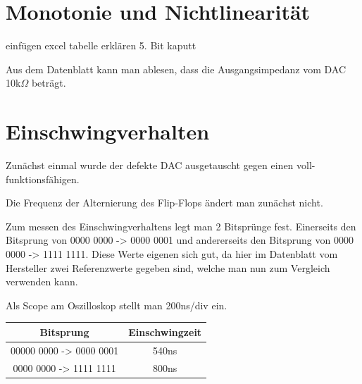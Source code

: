 \section{Monotonie und Nichtlinearität}
einfügen excel tabelle
erklären 5. Bit kaputt


Aus dem Datenblatt kann man ablesen, dass die Ausgangsimpedanz vom
DAC 10k$\Omega$ beträgt.



\section{Einschwingverhalten}

Zunächst einmal wurde der defekte DAC ausgetauscht 
gegen einen voll-funktionsfähigen. \newline

Die Frequenz der Alternierung des Flip-Flops ändert man zunächst nicht. \newline

Zum messen des Einschwingverhaltens legt man 2 Bitsprünge fest.
Einerseits den Bitsprung von 0000 0000 -> 0000 0001 und andererseits 
den Bitsprung von 0000 0000 -> 1111 1111.
Diese Werte eigenen sich gut, da hier im Datenblatt vom Hersteller 
zwei Referenzwerte gegeben sind, welche man nun zum Vergleich verwenden kann.\newline

Als Scope am Oszilloskop stellt man 200ns/div ein. \newline


\begin{tabular}[h]{c|c}
    Bitsprung & Einschwingzeit \\
    \hline
    00000 0000 -> 0000 0001 & 540ns\\
    \hline
    0000 0000 -> 1111 1111 & 800ns \\

\end{tabular}

